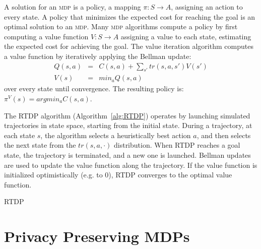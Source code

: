 \documentclass[letterpaper]{article} %
\newcommand{\mdp}{\textsc {mdp}\xspace}
\theoremstyle{remark}
\begin{document}
A solution for an \mdp is a policy, a mapping $\pi:S \rightarrow A$, assigning an action to every state. A policy that minimizes the expected cost  for reaching the goal is an optimal solution to an \mdp.
Many \mdp algorithms compute a policy by first computing a value function $V:S \rightarrow A$ assigning a value to each state, estimating the expected cost for achieving the goal.
The value iteration algorithm computes a value function by iteratively applying the Bellman update:
\begin{eqnarray}
Q(s,a) &=& C(s,a)+ \sum_{s'} tr(s,a,s') V(s')\\
V(s) &=& min_a Q(s,a)
\end{eqnarray}
over every state until convergence. The resulting policy is:
$\pi^V(s) = argmin_a C(s,a)$.

The RTDP algorithm (Algorithm~\ref{alg:RTDP}) \cite[e.g.]{kolobov2012planning} operates by launching simulated trajectories in state space, starting from the initial state. During a trajectory, at each state $s$, the algorithm selects a heuristically best action $a$, and then selects the next state from the $tr(s,a,\cdot)$ distribution. When RTDP reaches a goal state, the trajectory is terminated, and a new one is launched. Bellman updates are used to update the value function along the trajectory. If the value function is initialized optimistically (e.g. to 0), RTDP converges to the optimal value function.

\begin{algorithm}[t!]
\footnotesize
\caption{RTDP}
\label{alg:RTDP}
\end{algorithm}





\section{Privacy Preserving MDPs}
\end{document}
